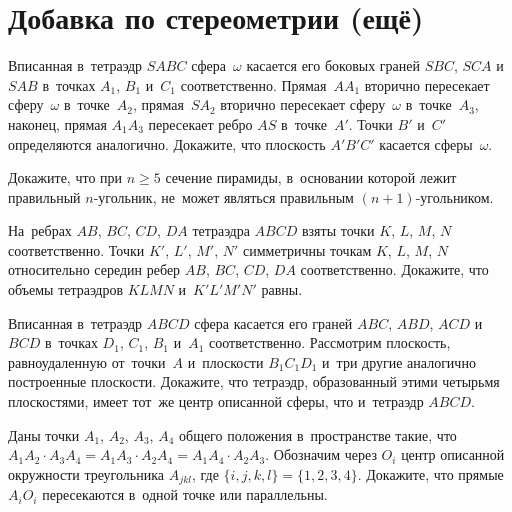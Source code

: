 
\section*{Добавка по стереометрии (ещё)}



\begin{problems}

\item
Вписанная в~тетраэдр $SABC$ сфера~$\omega$ касается его боковых граней
$SBC$, $SCA$ и~$SAB$ в~точках $A_1$, $B_1$ и~$C_1$ соответственно.
Прямая~$A A_1$ вторично пересекает сферу~$\omega$ в~точке~$A_2$,
прямая~$S A_2$ вторично пересекает сферу~$\omega$ в~точке~$A_3$, наконец,
прямая $A_1 A_3$ пересекает ребро $AS$ в~точке~$A'$.
Точки $B'$ и~$C'$ определяются аналогично.
Докажите, что плоскость $A'B'C'$ касается сферы~$\omega$.

\item
Докажите, что при $n \geq 5$ сечение пирамиды, в~основании которой лежит
правильный $n$-угольник, не~может являться правильным $(n + 1)$-угольником.

\itemx{*}
На~ребрах $AB$, $BC$, $CD$, $DA$ тетраэдра $ABCD$ взяты точки
$K$, $L$, $M$, $N$ соответственно.
Точки $K'$, $L'$, $M'$, $N'$ симметричны точкам $K$, $L$, $M$, $N$ относительно
середин ребер $AB$, $BC$, $CD$, $DA$ соответственно.
Докажите, что объемы тетраэдров $KLMN$ и~$K'L'M'N'$ равны.

\itemx{*}
Вписанная в~тетраэдр $ABCD$ сфера касается его граней
$ABC$, $ABD$, $ACD$ и~$BCD$ в~точках $D_1$, $C_1$, $B_1$ и~$A_1$
соответственно.
Рассмотрим плоскость, равноудаленную от~точки~$A$ и~плоскости $B_1 C_1 D_1$
и~три другие аналогично построенные плоскости.
Докажите, что тетраэдр, образованный этими четырьмя плоскостями, имеет тот~же
центр описанной сферы, что и~тетраэдр $ABCD$.

\itemx{*}
Даны точки $A_1$, $A_2$, $A_3$, $A_4$ общего положения в~пространстве такие,
что
$A_1 A_2 \cdot A_3 A_4 = A_1 A_3 \cdot A_2 A_4 = A_1 A_4 \cdot A_2 A_3$.
Обозначим через $O_i$ центр описанной окружности треугольника $A_{jkl}$, где
$\{ i, j, k, l \} = \{ 1, 2, 3, 4 \}$.
Докажите, что прямые $A_i O_i$ пересекаются в~одной точке или параллельны.

\end{problems}


